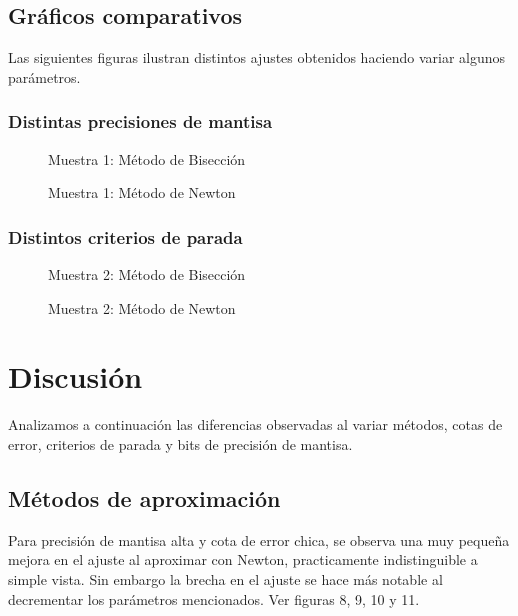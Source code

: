 \documentclass[a4paper,10pt,twoside]{article}
\newcommand{\grafico}[2]{
	\begin{figure}[H]
		\caption{#2}
		\centering
		
	\end{figure}
}
\begin{document}


\subsection{Gráficos comparativos}
Las siguientes figuras ilustran distintos ajustes obtenidos haciendo variar algunos parámetros.

\subsubsection{Distintas precisiones de mantisa}

\grafico{biseccion-mantisas.tex}{Muestra 1: Método de Bisección}
\grafico{newton-mantisas.tex}{Muestra 1: Método de Newton}
             
\subsubsection{Distintos criterios de parada}

\grafico{biseccion-criterios-parada.tex}{Muestra 2: Método de Bisección}
\grafico{newton-criterios-parada.tex}{Muestra 2: Método de Newton}




\section{Discusión}

Analizamos a continuación las diferencias observadas al variar métodos, cotas
de error, criterios de parada y bits de precisión de mantisa.


\subsection{Métodos de aproximación}
Para precisión de mantisa alta y cota de error chica, se observa una muy pequeña
mejora en el ajuste al aproximar con Newton, practicamente indistinguible a simple
vista. Sin embargo la brecha en el ajuste se hace más notable al decrementar
los parámetros mencionados. Ver figuras 8, 9, 10 y 11.
\end{document}

